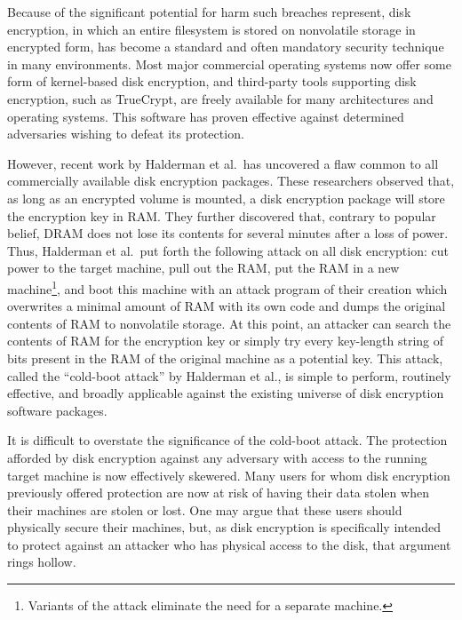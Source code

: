 \documentclass[letterpaper,twocolumn,nonatbib,10pt]{article}
\begin{document}
Because of the significant potential for harm such breaches represent,
disk encryption, in which an entire filesystem is stored on
nonvolatile storage in encrypted form, has become a standard and often
mandatory security technique in many environments\cite{bureaucracy}.
Most major commercial operating systems now offer some form of
kernel-based disk encryption\cite{linux}\cite{solaris}\cite{windows},
and third-party tools supporting disk encryption, such as
TrueCrypt\cite{truecrypt}, are freely available for many architectures
and operating systems.  This software has proven effective against
determined adversaries wishing to defeat its protection\cite{boucher}.

However, recent work\cite{princetonattack} by Halderman et al.\ has
uncovered a flaw common to all commercially available disk encryption
packages.  These researchers observed that, as long as an encrypted
volume is mounted, a disk encryption package will store the encryption
key in RAM.  They further discovered that, contrary to popular belief,
DRAM does not lose its contents for several minutes after a loss of
power.  Thus, Halderman et al.\ put forth the following attack on all
disk encryption: cut power to the target machine, pull out the RAM,
put the RAM in a new machine\footnote{Variants of the attack eliminate
  the need for a separate machine.}, and boot this machine with an
attack program of their creation which overwrites a minimal amount of
RAM with its own code and dumps the original contents of RAM to
nonvolatile storage.  At this point, an attacker can search the
contents of RAM for the encryption key or simply try every key-length
string of bits present in the RAM of the original machine as a
potential key.  This attack, called the ``cold-boot attack'' by
Halderman et al., is simple to perform, routinely effective, and
broadly applicable against the existing universe of disk encryption
software packages.

It is difficult to overstate the significance of the cold-boot attack.
The protection afforded by disk encryption against any adversary with
access to the running target machine is now effectively skewered.
Many users for whom disk encryption previously offered protection are
now at risk of having their data stolen when their machines are stolen
or lost.  One may argue that these users should physically secure
their machines, but, as disk encryption is specifically intended to
protect against an attacker who has physical access to the disk, that
argument rings hollow.
\end{document}
